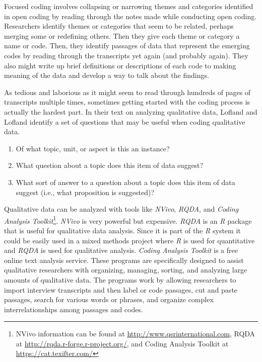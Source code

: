 Focused coding involves collapsing or narrowing themes and categories identified in open coding by reading through the notes made while conducting open coding. Researchers identify themes or categories that seem to be related, perhaps merging some or redefining others. Then they give each theme or category a name or code. Then, they identify passages of data that represent the emerging codes by reading through the transcripts yet again (and probably again). They also might write up brief definitions or descriptions of each code to making meaning of the data and develop a way to talk about the findings.

As tedious and laborious as it might seem to read through hundreds of pages of transcripts multiple times, sometimes getting started with the coding process is actually the hardest part. In their text on analyzing qualitative data, Lofland and Lofland\cite{lofland1995analytic} identify a set of questions that may be useful when coding qualitative data.

\begin{enumerate}
	\item Of what topic, unit, or aspect is this an instance?
	\item What question about a topic does this item of data suggest?
	\item What sort of answer to a question about a topic does this item of data suggest (i.e., what proposition is suggested)?
\end{enumerate}

Qualitative data can be analyzed with tools like \textit{NVivo}, \textit{RQDA}, and \textit{Coding Analysis Toolkit}\footnote{NVivo information can be found at \url{http://www.qsrinternational.com}, RQDA at \url{http://rqda.r-forge.r-project.org/}, and Coding Analysis Toolkit at \url{https://cat.texifter.com/}}. \textit{NVivo} is very powerful but expensive. \textit{RQDA} is an \textit{R} package that is useful for qualitative data analysis. Since it is part of the \textit{R} system it could be easily used in a mixed methods project where \textit{R} is used for quantitative and \textit{RQDA} is used for qualitative analysis. \textit{Coding Analysis Toolkit} is a free online text analysis service. These programs are specifically designed to assist qualitative researchers with organizing, managing, sorting, and analyzing large amounts of qualitative data. The programs work by allowing researchers to import interview transcripts and then label or code passages, cut and paste passages, search for various words or phrases, and organize complex interrelationships among passages and codes.

